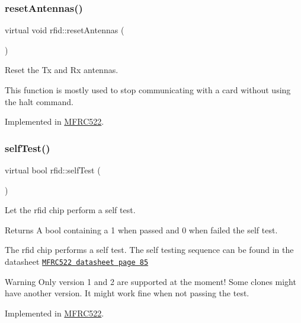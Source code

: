 \subsubsection{\texorpdfstring{reset\+Antennas()}{resetAntennas()}}
{\footnotesize\ttfamily virtual void rfid\+::reset\+Antennas (\begin{DoxyParamCaption}{ }\end{DoxyParamCaption})\hspace{0.3cm}{\ttfamily [pure virtual]}}



Reset the Tx and Rx antennas. 

This function is mostly used to stop communicating with a card without using the halt command. 

Implemented in \mbox{\hyperlink{class_m_f_r_c522_ac981022cc3ae79f727b2365e309cf691}{M\+F\+R\+C522}}.

\mbox{\label{classrfid_a93e5430380a14fd652e7ca1ce6443198}} 
\subsubsection{\texorpdfstring{self\+Test()}{selfTest()}}
{\footnotesize\ttfamily virtual bool rfid\+::self\+Test (\begin{DoxyParamCaption}{ }\end{DoxyParamCaption})\hspace{0.3cm}{\ttfamily [pure virtual]}}



Let the rfid chip perform a self test. 

\begin{DoxyReturn}{Returns}
A bool containing a 1 when passed and 0 when failed the self test.
\end{DoxyReturn}
The rfid chip performs a self test. The self testing sequence can be found in the datasheet \href{https://www.nxp.com/docs/en/data-sheet/MFRC522.pdf}{\tt M\+F\+R\+C522 datasheet page 85} \begin{DoxyWarning}{Warning}
Only version 1 and 2 are supported at the moment! Some clones might have another version. It might work fine when not passing the test. 
\end{DoxyWarning}


Implemented in \mbox{\hyperlink{class_m_f_r_c522_adcc4f5eb212c1a94e462eab459bd685e}{M\+F\+R\+C522}}.

